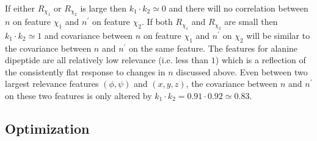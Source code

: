 If either $R_{\chi_1}$ or $R_{\chi_2}$ is large then $k_1 \cdot k_2 \simeq 0$ and there will no correlation between $n$ on feature $\chi_1$ and $n^{\prime}$ on feature $\chi_2$. If both $R_{\chi_1}$ and $R_{\chi_2}$ are small then $k_1 \cdot k_2 \simeq 1$ and covariance between $n$ on feature $\chi_1$ and $n^{\prime}$ on $\chi_2$ will be similar to the covariance between $n$ and $n^{\prime}$ on the same feature.  The features for alanine dipeptide are all relatively low relevance (i.e. less than $1$) which is a reflection of the  consistently flat response to changes in $n$ discussed above. Even between  two largest relevance features $(\phi, \psi)$ and $(x,y,z)$, the covariance between $n$ and $n^{\prime}$ on these two features is only altered by  $k_{1}\cdot k_{2} = 0.91\cdot0.92 \simeq 0.83$. 


\subsection{Optimization}\label{subsubsec:ala_opt}

